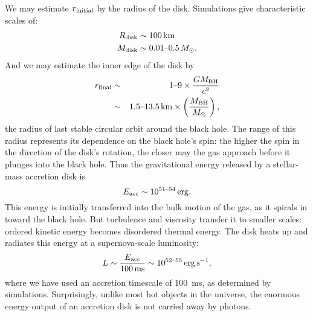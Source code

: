 We may estimate $r_{\rm initial}$ by the radius of the disk. Simulations give
characteristic scales of:
\begin{align}
  R_{\rm disk} &\sim 100\,{\rm km} \nonumber \\
  M_{\rm disk} &\sim 0.01\text{--}0.5\,M_\odot. \nonumber
\end{align}
And we may estimate the inner edge of the disk by
\begin{eqnarray}
  r_{\rm final} &\sim& 1\text{--}9 \times \frac{GM_{\rm BH}}{c^2} \nonumber \\
  &\sim& 1.5\text{--}13.5 \,{\rm km}\times \left(\frac{M_{\rm BH}}{M_\odot}\right), \nonumber
\end{eqnarray}
the radius of last stable circular orbit around the black hole. The range of this
radius represents its dependence on the black hole's spin: the higher the spin
in the direction of the disk's rotation, the closer may the gas approach before it
plunges into the black hole.
Thus the gravitational energy released by a stellar-mass accretion disk is
\begin{equation}
  E_{\rm acc} \sim 10^{51\text{--}54} \,{\rm erg}. \nonumber
\end{equation}
This energy is initially transferred into the bulk motion of the gas, as it
spirals in toward the black hole. But turbulence and viscosity transfer it to
smaller scales: ordered kinetic energy becomes disordered thermal energy.
The disk heats up and radiates this energy at a supernova-scale luminosity:
\begin{equation}
  \label{eqn:L_order_mag}
  L \sim \frac{E_{\rm acc}}{100\,{\rm ms}}
  \sim 10^{52\text{--}55}
  \,{\rm erg \, s}^{-1},
\end{equation}
where we have used an accretion timescale of 100~ms, as determined by simulations.
Surprisingly, unlike most hot objects in the universe, the enormous energy output
of an accretion disk is not carried away by photons.

